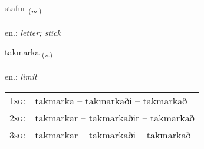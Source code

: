 \documentclass[frontgrid, backgrid]{flacards}\usepackage[]{graphicx}\usepackage[]{xcolor}
\begin{document}
\renewcommand{\flhead}{\vskip5pt \fboxsep=0pt {\small\bfseries\footnotesize Nafnorð | Noun}}
\renewcommand{\fcfoot}{\vskip5pt \fboxsep=0pt \hspace{2pt}{\small\bfseries\footnotesize 2K}}

\renewcommand{\blhead}{\vskip5pt {\small\bfseries\footnotesize Nafnorð | Noun }}
\renewcommand{\bcfoot}{\vskip5pt \hspace{2pt}{\small\bfseries\footnotesize 2K}}


{stafur \small{\textsubscript{(\textit{m.})}} \\[1ex] %
\textphonetic{[staːvʏr]} \\
en.: \emph{letter; stick} \\  [2ex]
\renewcommand*{\arraystretch}{0.8}
}

\renewcommand{\flhead}{\vskip5pt \fboxsep=0pt {\small\bfseries\footnotesize Sagnorð | Verb}}
\renewcommand{\fcfoot}{\vskip5pt \fboxsep=0pt \hspace{2pt}{\small\bfseries\footnotesize 2K}}

\renewcommand{\blhead}{\vskip5pt {\small\bfseries\footnotesize Sagnorð | Verb }}
\renewcommand{\bcfoot}{\vskip5pt \hspace{2pt}{\small\bfseries\footnotesize 2K}}


{takmarka \small{\textsubscript{(\textit{v.})}} \\[1ex] %
\textphonetic{[tʰakmar̥ka]} \\
en.: \emph{limit} \\  [2ex]
\renewcommand*{\arraystretch}{0.8}
\begin{tabular}{p{1cm}l}
\textsc{1sg}: & takmarka -- takmarkaði -- takmarkað \\ 
\textsc{2sg}: & takmarkar -- takmarkaðir -- takmarkað \\ 
\textsc{3sg}: & takmarkar -- takmarkaði -- takmarkað \\ 
\end{tabular}
}
\end{document}
